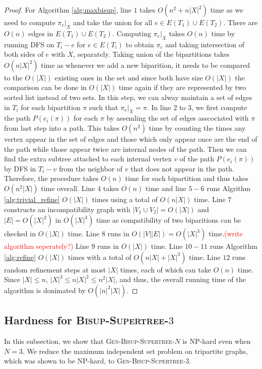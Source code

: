 \documentclass{bmcart}
\newcommand{\note}[1]{\textcolor{red}{#1}}
\newcommand{\genbisup}{\textsc{Gen-Bisup-Supertree-$N$}\xspace}
\newcommand{\genbisupthree}{\textsc{Gen-Bisup-Supertree-$3$}\xspace}
\begin{document}
\begin{proof}
For Algorithm \ref{alg:maxbisup}, line $1$ takes $O(n^2+ n|X|^2)$ time as we need to compute $\pi_e|_X$ and take the union for all $e \in E(T_1) \cup E(T_2)$. There are $O(n)$ edges in $E(T_1) \cup E(T_2)$. Computing $\pi_e|_X$ takes $O(n)$ time by running DFS on $T_i - e$ for $e \in E(T_i)$ to obtain $\pi_e$ and taking intersection of both sides of $e$ with $X$, separately. Taking union of the bipartitions takes $O(n |X|^2)$ time as whenever we add a new biparition, it needs to be compared to the $O(|X|)$ existing ones in the set and since both have size $O(|X|)$ the comparison can be done in $O(|X|)$ time again if they are represented by two sorted list instead of two sets. In this step, we can alway maintain a set of edges in $T_i$ for each bipartition $\pi$ such that $\pi_e|_X = \pi$. In line $2$ to $3$, we first compute the path $P(e_i(\pi))$ for each $\pi$ by assemling the set of edges asscociated with $\pi$ from last step into a path. This takes $O(n^2)$ time by counting the times any vertex appear in the set of edges and those which only appear once are the end of the path while those appear twice are internal nodes of the path. Then we can find the extra subtree attached to each internal vertex $v$ of the path $P(e_i(\pi))$ by DFS in $T_i - v$ from the neighbor of $v$ that does not appear in the path. Therefore, the procedure takes $O(n)$ time for each bipartition and thus takes $O(n^2|X|)$ time overall. Line $4$ takes $O(n)$ time and line $5-6$ runs Algrithm \ref{alg:trivial_refine} $O(|X|)$ times using a total of $O(n|X|)$ time. Line $7$ constructs an incompatibility graph with $|V_1\cup V_2| = O(|X|)$ and $|E| = O(|X|^2)$ in $O(|X|^3)$ time as compatibility of two biparitions can be checked in $O(|X|)$ time. Line $8$ runs in $O(|V||E|) = O(|X|^3)$ time.\note{(write algorithm seperately?)} Line $9$ runs in $O(|X|)$ time. Line $10-11$ runs Algorithm \ref{alg:refine} $O(|X|)$ times with a total of $O(n|X|+|X|^3)$ time. Line $12$ runs random refinement steps at most $|X|$ times, each of which can take $O(n)$ time. Since $|X| \le n$, $|X|^3 \le n|X|^2 \le n^2|X|$, and thus, the overall running time of the algorithm is donimated by $O(|n|^2|X|)$.
\end{proof}

\subsection{Hardness for \textsc{Bisup-Supertree-$3$}}
In this subsection, we show that \genbisup is NP-hard even when $N = 3$. We reduce the maximum independent set problem on tripartite graphs, which was shown to be NP-hard, to \genbisupthree.
\end{document}

